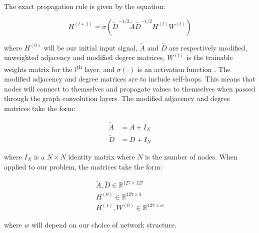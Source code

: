 \documentclass[../thesis.tex]{subfiles}
\begin{document}
The exact propagation rule is given by the equation:
\begin{linenomath}\begin{equation}\label{eq:conv}
H^{(l+1)} = \sigma\left( \tilde{D}^{-1/2} \tilde{A} \tilde{D}^{-1/2} H^{(l)} W^{(l)} \right)
\end{equation}\end{linenomath}
where $H^{(0)}$ will be our initial input signal, $\tilde{A}$ and $\tilde{D}$ are respectively modified, unweighted adjacency and modified degree matrices, $W^{(l)}$ is the trainable weights matrix for the $l$\textsuperscript{th} layer, and $\sigma(\cdot)$ is an activation function \cite{GCNN_Kipf}.
The modified adjacency and degree matrices are to include self-loops.
This means that nodes will connect to themselves and propagate values to themselves when passed through the graph convolution layers.
The modified adjacency and degree matrices take the form:
\begin{linenomath}\begin{align*}
	\tilde{A} &= A + I_{N} \\
	\tilde{D} &= D + I_{N}
\end{align*}\end{linenomath}
where $I_{N}$ is a $N \times N$ identity matrix where $N$ is the number of nodes.
When applied to our problem, the matrices take the form:
\begin{linenomath}\begin{align*}
	\tilde{A}, \tilde{D} \in \mathbb{R}^{127 \times 127} \\
	H^{(0)} \in \mathbb{R}^{127 \times 3} \\
	H^{(1)}, W^{(0)} \in \mathbb{R}^{127 \times w}
\end{align*}\end{linenomath}
where $w$ will depend on our choice of network structure.
\end{document}
